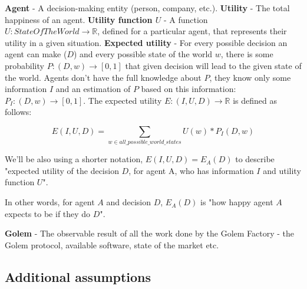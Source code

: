 \documentclass{article}
\begin{document}
\textbf{Agent} - A decision-making entity (person, company, etc.).
\newline
\textbf{Utility} - The total happiness of an agent.
\newline
\textbf{Utility function $U$} - A function $U: StateOfTheWorld \to \mathbb{R}$, defined for a particular agent, that represents their utility in a given situation.
\newline
\textbf{Expected utility} - For every possible decision an agent can make ($D$) and every possible state of the world $w$, there is some probability $P: (D, w) \rightarrow [0, 1]$  that given decision will lead to the given state of the world.
Agents don't have the full knowledge about $P$, they know only some information $I$ and an estimation of $P$ based on this information: $P_I: (D, w) \rightarrow [0, 1]$. The expected utility $E: (I, U, D) \to \mathbb{R}$ is defined as follows:

\begin{equation}
E(I, U, D) = \sum_{w \in all\_possible\_world\_states}U(w) * P_I(D, w)
\end{equation}

We'll be also using a shorter notation, $E(I, U, D) = E_A(D)$ to describe "expected utility of the decision $D$, for agent A, who has information $I$ and utility function $U$".

In other words, for agent $A$ and decision $D$, $E_A(D)$ is "how happy agent $A$ expects to be if they do $D$".
\newline

\textbf{Golem} - The observable result of all the work done by the Golem Factory - the Golem protocol, available software, state of the market etc.
\newline

\subsection{Additional assumptions}
\end{document}
